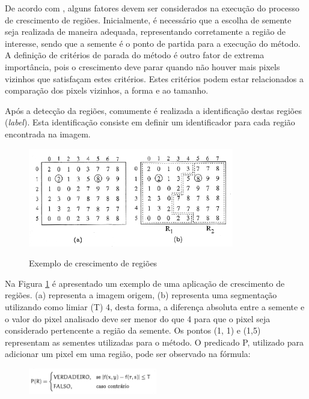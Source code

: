 \documentclass[
	12pt,				%
	oneside,			%
	a4paper,			%
	english,			%
	french,				%
	spanish,			%
	brazil,				%
	]{abntex2}
\begin{document}
De acordo com \citet{conciAzevedoLeta:2008}, alguns fatores devem ser considerados na execução do processo de crescimento de regiões. Inicialmente, é necessário que a escolha de semente seja realizada de maneira adequada, representando corretamente a região de interesse, sendo que a semente é o ponto de partida para a execução do método. A definição de critérios de parada do método é outro fator de extrema importância, pois o crescimento deve parar quando não houver mais pixels vizinhos que satisfaçam estes critérios. Estes critérios podem estar relacionados a comparação dos pixels vizinhos, a forma e ao tamanho.

Após a detecção da regiões, comumente é realizada a identificação destas regiões (\textit{label}). Esta identificação consiste em definir um identificador para cada região encontrada na imagem. 

\begin{figure}[ht]
\centering
\caption{Exemplo de crescimento de regiões}
\includegraphics[width=0.8\textwidth]{imagens/crescimento_regiao.png}
\label{fig:crescimento_regiao}
\end{figure}

Na Figura \ref{fig:crescimento_regiao} é apresentado um exemplo de uma aplicação de crescimento de regiões. (a) representa a imagem origem, (b) representa uma segmentação utilizando como limiar (T) 4, desta forma, a diferença absoluta entre a semente e o valor do pixel analisado deve ser menor do que 4 para que o pixel seja considerado pertencente a região da semente. Os pontos (1, 1) e (1,5) representam as sementes utilizadas para o método. O predicado P, utilizado para adicionar um pixel em uma região, pode ser observado na fórmula:

\begin{figure}[ht]
\centering
\includegraphics[width=0.5\textwidth]{imagens/crescimentoregiao_formula.png}
\end{figure}
\end{document}
